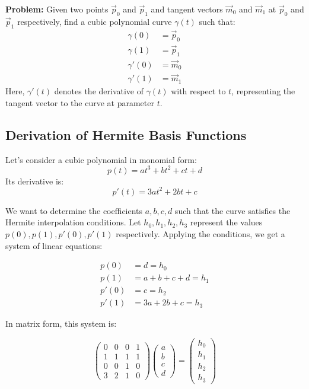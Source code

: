\documentclass{article}
\begin{document}
\textbf{Problem:} Given two points \(\vec{p}_0\) and \(\vec{p}_1\) and tangent vectors \(\vec{m}_0\) and \(\vec{m}_1\) at \(\vec{p}_0\) and \(\vec{p}_1\) respectively, find a cubic polynomial curve \(\gamma(t)\) such that:
\begin{align*}
\gamma(0) &= \vec{p}_0 \\
\gamma(1) &= \vec{p}_1 \\
\gamma'(0) &= \vec{m}_0 \\
\gamma'(1) &= \vec{m}_1
\end{align*}
Here, \(\gamma'(t)\) denotes the derivative of \(\gamma(t)\) with respect to \(t\), representing the tangent vector to the curve at parameter \(t\).

\subsection{Derivation of Hermite Basis Functions}

Let's consider a cubic polynomial in monomial form:
\begin{equation}
p(t) = a t^3 + b t^2 + c t + d
\end{equation}
Its derivative is:
\begin{equation}
p'(t) = 3 a t^2 + 2 b t + c
\end{equation}

We want to determine the coefficients \(a, b, c, d\) such that the curve satisfies the Hermite interpolation conditions. Let \(h_0, h_1, h_2, h_3\) represent the values \(p(0), p(1), p'(0), p'(1)\) respectively. Applying the conditions, we get a system of linear equations:

\begin{align*}
p(0) &= d = h_0 \\
p(1) &= a + b + c + d = h_1 \\
p'(0) &= c = h_2 \\
p'(1) &= 3a + 2b + c = h_3
\end{align*}

In matrix form, this system is:

\[ \begin{pmatrix} 0 & 0 & 0 & 1 \\ 1 & 1 & 1 & 1 \\ 0 & 0 & 1 & 0 \\ 3 & 2 & 1 & 0 \end{pmatrix} \begin{pmatrix} a \\ b \\ c \\ d \end{pmatrix} = \begin{pmatrix} h_0 \\ h_1 \\ h_2 \\ h_3 \end{pmatrix} \]
\end{document}
